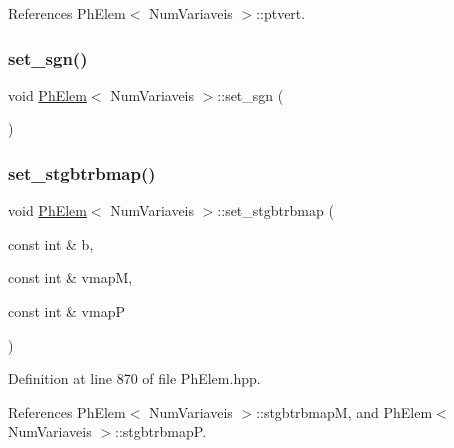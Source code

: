 References Ph\+Elem$<$ Num\+Variaveis $>$\+::ptvert.

\mbox{\label{classPhElem_a03505c861fbcdb7cf8faec9fe5eea088}} 
\subsubsection{\texorpdfstring{set\+\_\+sgn()}{set\_sgn()}}
{\footnotesize\ttfamily void \hyperlink{classPhElem}{Ph\+Elem}$<$ Num\+Variaveis $>$\+::set\+\_\+sgn (\begin{DoxyParamCaption}{ }\end{DoxyParamCaption})\hspace{0.3cm}{\ttfamily [inherited]}}

\mbox{\label{classPhElem_ae63196241e8f39617acb1984cb06910e}} 
\subsubsection{\texorpdfstring{set\+\_\+stgbtrbmap()}{set\_stgbtrbmap()}}
{\footnotesize\ttfamily void \hyperlink{classPhElem}{Ph\+Elem}$<$ Num\+Variaveis $>$\+::set\+\_\+stgbtrbmap (\begin{DoxyParamCaption}\item[{const int \&}]{b,  }\item[{const int \&}]{vmapM,  }\item[{const int \&}]{vmapP }\end{DoxyParamCaption})\hspace{0.3cm}{\ttfamily [inherited]}}



Definition at line 870 of file Ph\+Elem.\+hpp.



References Ph\+Elem$<$ Num\+Variaveis $>$\+::stgbtrbmapM, and Ph\+Elem$<$ Num\+Variaveis $>$\+::stgbtrbmapP.

\mbox{\label{classPhElem_ae226a41912e8e7c76be365518b2a38e2}} 
